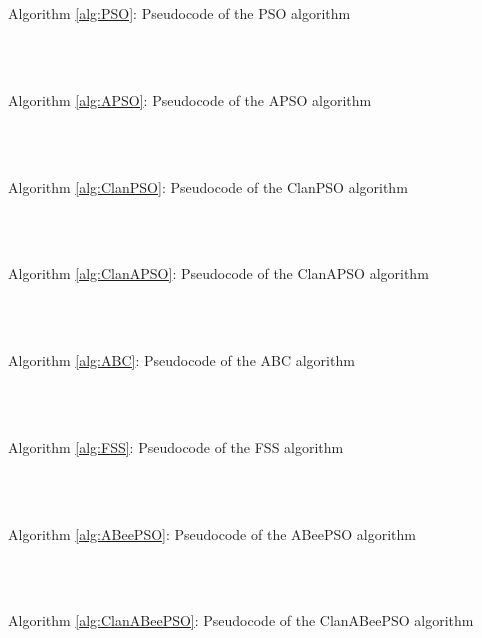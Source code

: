 \begin{tabbing}
\parbox{5in}{Algorithm \ref{alg:PSO}: Pseudocode of the PSO algorithm\dotfill \pageref{alg:PSO}}\\
\\
\parbox{5in}{Algorithm \ref{alg:APSO}: Pseudocode of the APSO algorithm\dotfill \pageref{alg:APSO}}\\
\\
\parbox{5in}{Algorithm \ref{alg:ClanPSO}: Pseudocode of the ClanPSO algorithm\dotfill \pageref{alg:ClanPSO}}\\
\\
\parbox{5in}{Algorithm \ref{alg:ClanAPSO}: Pseudocode of the ClanAPSO algorithm\dotfill \pageref{alg:ClanAPSO}}\\
\\
\parbox{5in}{Algorithm \ref{alg:ABC}: Pseudocode of the ABC algorithm\dotfill \pageref{alg:ABC}}\\
\\
\parbox{5in}{Algorithm \ref{alg:FSS}: Pseudocode of the FSS algorithm\dotfill \pageref{alg:FSS}}\\
\\
\parbox{5in}{Algorithm \ref{alg:ABeePSO}: Pseudocode of the ABeePSO algorithm\dotfill \pageref{alg:ABeePSO}}\\
\\
\parbox{5in}{Algorithm \ref{alg:ClanABeePSO}: Pseudocode of the ClanABeePSO algorithm\dotfill \pageref{alg:ClanABeePSO}}\\
\\

\end{tabbing}
